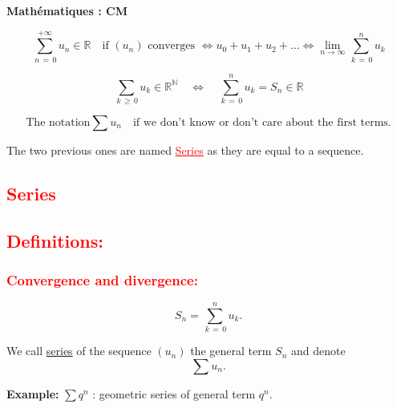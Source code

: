 \documentclass[a4paper,12pt]{article}
\begin{document}
\begin{center}
\textbf{Mathématiques : CM}
\end{center}

\[
\sum_{\,n\,=\,0}^{+\infty} u_n \in \mathbb{R} \quad \text{if } (u_n) \text{ converges } 
\Leftrightarrow u_0 + u_1 + u_2 + \dots 
\Leftrightarrow \lim_{n \to \infty} \sum_{\,k\,=\,0}^n u_k
\]

\[
\sum_{\,k\, \geq\, 0} u_k \in \mathbb{R}^{\mathbb{N}} 
\quad \Leftrightarrow \quad \sum_{\,k\, =\, 0} ^ {n} u_k = S_n \in \mathbb{R}
\]

\[
\text{The notation} \sum u_n\quad \text{if we don’t know or don’t care about the first terms.}
\]

\noindent
The two previous ones are named \textcolor{red}{\underline{Series}} as they are equal to a sequence.

\vspace{0.5cm}

\begin{center}
\Large \textcolor{red}{\section*{Series}}
\end{center}

\textcolor{red}{\subsection*{Definitions:}}\bigskip

\textcolor{red}{\subsubsection*{Convergence and divergence:}}\bigskip

\[
S_n = \sum_{\,k\,=\,0}^n u_k.
\]

We call \underline{series} of the sequence $(u_n)$ the general term $S_n$ and denote
\[
\sum u_n.
\]


\vspace{0.5cm}

\textbf{Example:} \quad 
\(\sum q^n\) : geometric series of general term \(q^n\).
\end{document}
